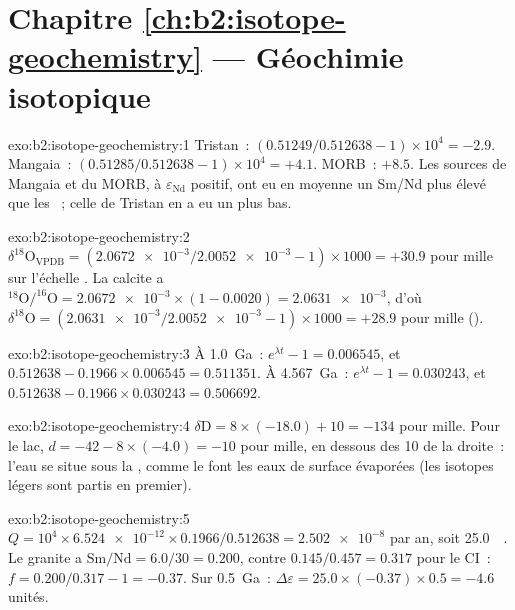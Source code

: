\section*{Chapitre \ref{ch:b2:isotope-geochemistry} --- Géochimie isotopique}

\begin{solution}{exo:b2:isotope-geochemistry:1}
Tristan~: $(0.51249/0.512638 - 1)\times10^4 = -2.9$. Mangaia~: $(0.51285/0.512638 -
1)\times10^4 = +4.1$. MORB~: $+8.5$. Les sources de Mangaia et du MORB, à $\varepsilon_{\mathrm{Nd}}$ positif,
ont eu en moyenne un Sm/Nd plus élevé que les ~; celle de Tristan en a eu un
plus bas.
\end{solution}

\begin{solution}{exo:b2:isotope-geochemistry:2}
$\delta^{18}\mathrm{O}_{\mathrm{VPDB}} = (\num{2.0672e-3}/\num{2.0052e-3} - 1)\times1000 =
+30.9$ pour mille sur l'échelle . La calcite a $^{18}\mathrm{O}/^{16}\mathrm{O} =
\num{2.0672e-3}\times(1 - 0.0020) = \num{2.0631e-3}$, d'où $\delta^{18}\mathrm{O} =
(\num{2.0631e-3}/\num{2.0052e-3} - 1)\times1000 = +28.9$ pour mille ().
\end{solution}

\begin{solution}{exo:b2:isotope-geochemistry:3}
À \qty{1.0}{Ga}~: $e^{\lambda t} - 1 = 0.006545$, et $0.512638 - 0.1966\times0.006545 =
0.511351$. À \qty{4.567}{Ga}~: $e^{\lambda t}-1 = 0.030243$, et $0.512638 -
0.1966\times0.030243 = 0.506692$.
\end{solution}

\begin{solution}{exo:b2:isotope-geochemistry:4}
$\delta\mathrm{D} = 8\times(-18.0) + 10 = -134$ pour mille. Pour le lac, $d = -42 -
8\times(-4.0) = -10$ pour mille, en dessous des 10 de la droite~: l'eau se situe sous la , comme le font les eaux de surface évaporées (les isotopes légers sont partis en premier).
\end{solution}

\begin{solution}{exo:b2:isotope-geochemistry:5}
$Q = 10^4\times\num{6.524e-12}\times0.1966/0.512638 = \num{2.502e-8}$ par an, soit
\qty{25.0}{\per\Ga}. Le granite a $\mathrm{Sm}/\mathrm{Nd} = 6.0/30 = 0.200$,
contre $0.145/0.457 = 0.317$ pour le CI~: $f = 0.200/0.317 - 1 = -0.37$. Sur
\qty{0.5}{Ga}~: $\Delta\varepsilon = 25.0\times(-0.37)\times0.5 = -4.6$ unités.
\end{solution}

